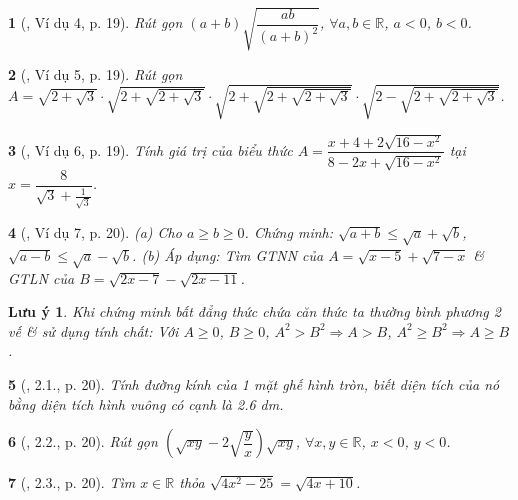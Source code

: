 \documentclass{article}
\newtheorem{baitoan}{}%
\newtheorem{luuy}{Lưu ý}
\begin{document}
\begin{baitoan}[\cite{Binh_boi_duong_Toan_9_tap_1}, Ví dụ 4, p. 19]
	Rút gọn $(a + b)\sqrt{\dfrac{ab}{(a + b)^2}}$, $\forall a,b\in\mathbb{R}$, $a < 0$, $b < 0$.
\end{baitoan}

\begin{baitoan}[\cite{Binh_boi_duong_Toan_9_tap_1}, Ví dụ 5, p. 19]
	Rút gọn $A = \sqrt{2 + \sqrt{3}}\cdot \sqrt{2 + \sqrt{2 + \sqrt{3}}}\cdot\sqrt{2 + \sqrt{2 + \sqrt{2 + \sqrt{3}}}}\cdot\sqrt{2 - \sqrt{2 + \sqrt{2 + \sqrt{3}}}}$.
\end{baitoan}

\begin{baitoan}[\cite{Binh_boi_duong_Toan_9_tap_1}, Ví dụ 6, p. 19]
	Tính giá trị của biểu thức $A = \dfrac{x + 4 + 2\sqrt{16 - x^2}}{8 - 2x + \sqrt{16 - x^2}}$ tại $x = \dfrac{8}{\sqrt{3} + \frac{1}{\sqrt{3}}}$.
\end{baitoan}

\begin{baitoan}[\cite{Binh_boi_duong_Toan_9_tap_1}, Ví dụ 7, p. 20]
	(a) Cho $a\ge b\ge0$. Chứng minh: $\sqrt{a + b}\le\sqrt{a} + \sqrt{b}$, $\sqrt{a - b}\le\sqrt{a} - \sqrt{b}$. (b) Áp dụng: Tìm {\rm GTNN} của $A = \sqrt{x - 5} + \sqrt{7 - x}$ \& {\rm GTLN} của $B = \sqrt{2x - 7} - \sqrt{2x - 11}$.
\end{baitoan}

\begin{luuy}
	Khi chứng minh bất đẳng thức chứa căn thức ta thường bình phương 2 vế \& sử dụng tính chất: Với $A\ge0$, $B\ge0$, $A^2 > B^2\Rightarrow A > B$, $A^2\ge B^2\Rightarrow A\ge B$.
\end{luuy}

\begin{baitoan}[\cite{Binh_boi_duong_Toan_9_tap_1}, 2.1., p. 20]
	Tính đường kính của 1 mặt ghế hình tròn, biết diện tích của nó bằng diện tích hình vuông có cạnh là {\rm2.6 dm}.
\end{baitoan}

\begin{baitoan}[\cite{Binh_boi_duong_Toan_9_tap_1}, 2.2., p. 20]
	Rút gọn $\left(\sqrt{xy} - 2\sqrt{\dfrac{y}{x}}\right)\sqrt{xy}$, $\forall x,y\in\mathbb{R}$, $x < 0$, $y < 0$.
\end{baitoan}

\begin{baitoan}[\cite{Binh_boi_duong_Toan_9_tap_1}, 2.3., p. 20]
	Tìm $x\in\mathbb{R}$ thỏa $\sqrt{4x^2 - 25} = \sqrt{4x + 10}$.
\end{baitoan}
\end{document}
